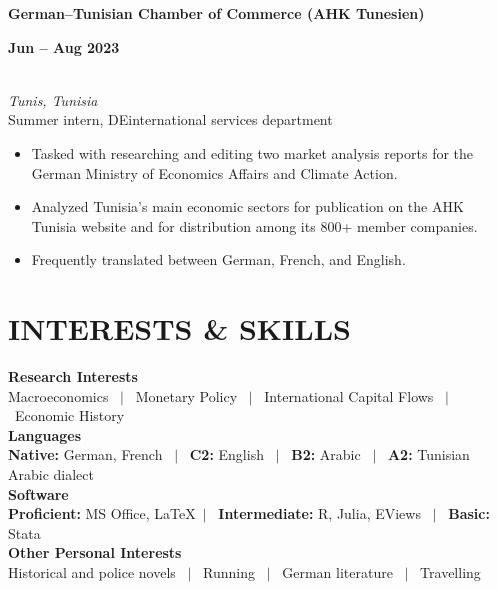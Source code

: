 \documentclass[a4paper,9pt]{extarticle}
\begin{document}
\noindent
\begin{minipage}[t]{0.7\textwidth}
  \textbf{German--Tunisian Chamber of Commerce (AHK Tunesien)}
\end{minipage}
\begin{minipage}[t]{0.3\textwidth}
  \raggedleft \textbf{Jun -- Aug 2023}
\end{minipage}
\\
\textit{Tunis, Tunisia} \\ 
Summer intern, DEinternational services department 
\begin{itemize}[noitemsep, topsep=0pt, left=0.65cm]
    \item Tasked with researching and editing two market analysis reports for the German Ministry of Economics Affairs and Climate Action.
    \item Analyzed Tunisia's main economic sectors for publication on the AHK Tunisia website and for distribution among its 800+ member companies. 
    \item Frequently translated between German, French, and English. \\
\end{itemize}


\section*{INTERESTS \& SKILLS}

\noindent
\newline
\textbf{Research Interests} \\
Macroeconomics \ $|$ \ Monetary Policy \ $|$ \ International Capital Flows \ $|$ \ Economic History \\

\noindent
\textbf{Languages} \\
\textbf{Native:} German, French \ $|$ \ \textbf{C2:} English \ $|$ \ \textbf{B2:} Arabic \ $|$ \ \textbf{A2:} Tunisian Arabic dialect \\

\noindent
\textbf{Software} \\
\textbf{Proficient:} MS Office, \LaTeX \ $|$ \ \textbf{Intermediate:} R, Julia, EViews \ $|$ \ \textbf{Basic:} Stata  \\

\noindent
\textbf{Other Personal Interests} \\
Historical and police novels \ $|$ \ Running \ $|$ \ German literature \ $|$ \ Travelling  \\
\end{document}
